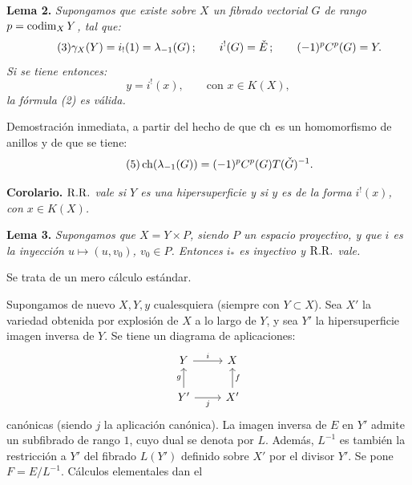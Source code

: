 \textbf{Lema 2.} \emph{Supongamos que existe sobre \(X\) un fibrado vectorial \(G\) de rango \(p=\codim_XY\), tal que:}
\begin{equation}\tag{3}
  \gamma_X(Y)=\sisi{i_*}{i_!}(1)=\lambda_{-1}(G)\,;\qquad
  i^!(G)=\check E\,;\qquad
  (-1)^pC^p(G)=Y.
\end{equation}
\emph{Si se tiene entonces:}
\begin{equation}\tag{4}
  y=i^!(x),\qquad \text{con }x\in K(X),
\end{equation}
\emph{la fórmula (2) es válida.}

Demostración inmediata, a partir del hecho de que \(\ch\) es un homomorfismo de anillos y de que se tiene:
\begin{equation}\tag{5}
  \ch(\lambda_{-1}(G))=(-1)^pC^p(G)T(\check G)^{-1}.
\end{equation}

\textbf{Corolario.} \emph{\(\RR\) vale si \(Y\) es una hipersuperficie y si \(y\) es de la forma \(i^!(x)\), con \(x\in K(X)\).}

\textbf{Lema 3.} \emph{Supongamos que \(X=Y\times P\), siendo \(P\) un espacio proyectivo, y que \(i\) es la inyección \(u\mapsto (u,v_0)\), \(v_0\in P\). Entonces \(i_*\) es inyectivo y \(\RR\) vale.}

Se trata de un mero cálculo estándar.

Supongamos de nuevo \(X,Y,y\) cualesquiera (siempre con \(Y\subset X\)). Sea \(X'\) la variedad obtenida por explosión de \(X\) a lo largo de \(Y\), y sea \(Y'\) la hipersuperficie imagen inversa de \(Y\). Se tiene un diagrama de aplicaciones:
\[
\begin{tikzcd}
Y \arrow[r,"i"] & X\\
Y' \arrow[u,"g"] \arrow[r,"j"'] & X' \arrow[u,"f"']
\end{tikzcd}
\]
canónicas (siendo \(j\) la aplicación canónica). La imagen inversa de \(E\) en \(Y'\) admite un subfibrado de rango \(1\), cuyo dual se denota por \(L\). Además, \(L^{-1}\) es también la restricción a \(Y'\) del fibrado \(L(Y')\) definido sobre \(X'\) por el divisor \(Y'\). Se pone \(F=E/L^{-1}\). Cálculos elementales dan el


